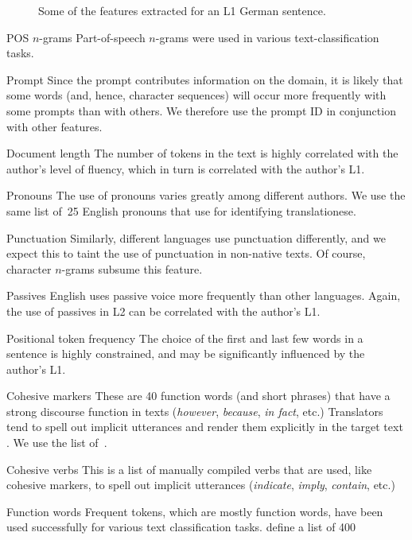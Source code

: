 \documentclass[11pt,letterpaper]{article}
\newcommand{\textnl}{\textsl}
\begin{document}
\begin{figure*}
\caption{Some of the features extracted for an L1 German sentence.}\label{fig:german}
\end{figure*}

\begin{compactdesc}
\item[POS $n$-grams] Part-of-speech $n$-grams were used in various
  text-classification tasks.
\item[Prompt] Since the prompt contributes information on the domain,
  it is likely that some words (and, hence, character sequences) will
  occur more frequently with some prompts than with others. We
  therefore use the prompt ID in conjunction with other features.
\item[Document length] The number of tokens in the text is highly
  correlated with the author's level of fluency, which in turn is
  correlated with the author's L1.
\item[Pronouns] The use of pronouns varies greatly among different
  authors. We use the same list of~25 English pronouns that
  \citet{vered:noam:shuly} use for identifying translationese.
\item[Punctuation] Similarly, different languages use punctuation
  differently, and we expect this to taint the use of punctuation in
  non-native texts. Of course, character $n$-grams subsume this feature.
\item[Passives] English uses passive voice more frequently than other
  languages. Again, the use of passives in L2 can be correlated with
  the author's L1.
\item[Positional token frequency] The choice of the first and last few
  words in a sentence is highly constrained, and may be significantly
  influenced by the author's L1.
\item[Cohesive markers] These are 40 function words (and short
  phrases) that have a strong discourse function in texts (\textnl{however},
  \textnl{because}, \textnl{in fact}, etc.) Translators tend to spell out implicit
  utterances and render them explicitly in the target text
  \citep{Blum-Kulka:1986}. We use the list
  of~\citet{vered:noam:shuly}.
\item[Cohesive verbs] This is a list of manually compiled verbs that
  are used, like cohesive markers, to spell out implicit utterances
  (\textnl{indicate}, \textnl{imply}, \textnl{contain}, etc.)
\item[Function words] Frequent tokens, which are mostly function
  words, have been used successfully for various text classification
  tasks. \citet{koppel-ordan:2011:ACL-HLT2011} define a list of 400

\end{compactdesc}
\end{document}
